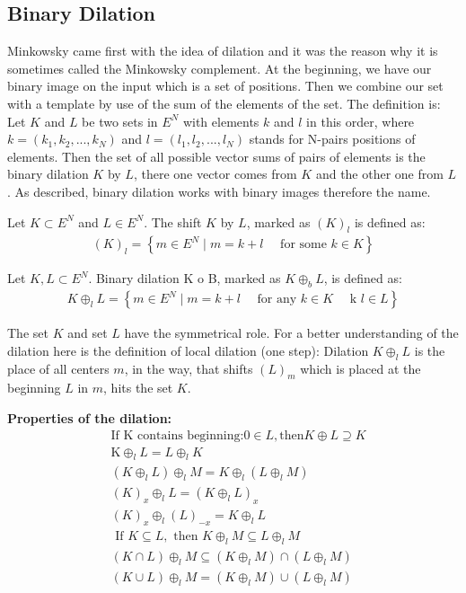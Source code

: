 \subsection{Binary Dilation}
Minkowsky came first with the idea of dilation and it was the reason why it is sometimes called the Minkowsky complement. At the beginning, we have our binary image on the input which is a set of positions. Then we combine our set with a template by use of the sum of the elements of the set. The definition is: Let $K$ and $L$ be two sets in $E^N$ with elements $k$ and $l$ in this order, where $k = (k_1, k_2, ..., k_N)$ and $l = (l_1, l_2, ..., l_N )$ stands for N-pairs positions of elements. Then the set of all possible vector sums of pairs of elements is the binary dilation $K$ by $L$, there one vector comes from $K$ and the other one from $L$. As described, binary dilation works with binary images therefore the name. \cite{shih2009image} \cite{goutsias2000mathematical}


Let $K \subset E^N$ and $L \in E^N$. The shift $K$ by $L$, marked as $(K)_l$ is defined as: \cite{shih2009image} \cite{goutsias2000mathematical}
\begin{align}
    (K)_{l}=\left\{m \in E^{N} \mid m=k+l \quad \text { for some } k \in K\right\}
\end{align}

Let $K, L \subset E^N$. Binary dilation K o B, marked as $K \oplus_b L$, is defined as: \cite{shih2009image} \cite{goutsias2000mathematical}
\begin{align}
    K \oplus_{l} L=\left\{m \in E^{N} \mid m=k+l \quad \text { for any } k \in K \quad \text { k } l \in L\right\}
\end{align}

The set $K$ and set $L$ have the symmetrical role. For a better understanding of the dilation here is the definition of local dilation (one step): Dilation $K \oplus_l L$ is the place of all centers $m$, in the way, that shifts $(L)_m$ which is placed at the beginning $L$ in $m$, hits the set $K$.\cite{shih2009image} \cite{goutsias2000mathematical}

\textbf{Properties of the dilation:} \cite{shih2009image}
\begin{align}
    &\text{If K contains beginning:} 0 \in L, \text{then} K \oplus L \supseteq K\\
    &\mathrm{K} \oplus_{l} L=L \oplus_{l} K\\
    &\left(K \oplus_{l} L\right) \oplus_{l} M=K \oplus_{l}\left(L \oplus_{l} M\right)\\
    &(K)_{x} \oplus_{l} L=\left(K \oplus_{l} L\right)_{x}\\
    &(K)_{x} \oplus_{l}(L)_{-x}=K \oplus_{l} L\\
    &\text { If } K \subseteq L, \text { then } K \oplus_{l} M \subseteq L \oplus_{l} M\\
    &(K \cap L) \oplus_{l} M \subseteq\left(K \oplus_{l} M\right) \cap\left(L \oplus_{l} M\right)\\
    &(K \cup L) \oplus_{l} M=\left(K \oplus_{l} M\right) \cup\left(L \oplus_{l} M\right)
\end{align}


